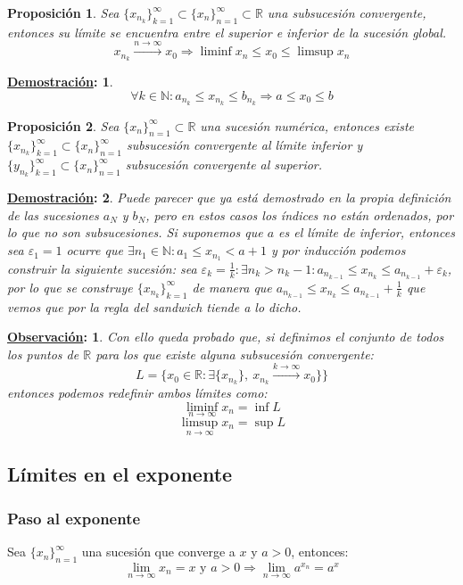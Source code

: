 \documentclass[10pt,a4paper,openright]{book}
\theoremstyle{break}
\newtheorem*{prop}{Proposición}
\newtheorem*{demo}{\underline{Demostración}:}
\newtheorem*{obs}{\underline{Observación}:}
\begin{document}
\begin{prop}
Sea $\{x_{n_k}\}_{k=1}^\infty\subset \{x_n\}_{n=1}^\infty\subset \mathbb{R}$ una subsucesión convergente, entonces su límite se encuentra entre el superior e inferior de la sucesión global.
$$ x_{n_k}\xrightarrow{n\rightarrow\infty}x_0 \Rightarrow \liminf x_n \leq x_0 \leq \limsup x_n$$
\end{prop}
\begin{demo}
$$\forall k\in \mathbb N: a_{n_k}\leq x_{n_k} \leq b_{n_k} \Rightarrow a\leq x_0 \leq b$$
\end{demo}

\begin{prop}
Sea $\{x_n\}_{n=1}^\infty \subset \mathbb{R}$ una sucesión numérica, entonces existe $\{x_{n_k}\}_{k=1}^\infty\subset \{x_n\}_{n=1}^\infty$ subsucesión convergente al límite inferior y $\{y_{n_k}\}_{k=1}^\infty\subset \{x_n\}_{n=1}^\infty$ subsucesión convergente al superior.
\end{prop}
\begin{demo}
Puede parecer que ya está demostrado en la propia definición de las sucesiones $a_N$ y $b_N$, pero en estos casos los índices no están ordenados, por lo que no son subsucesiones.
Si suponemos que $a$ es el límite de inferior, entonces sea $\varepsilon_1=1$ ocurre que $\exists n_1\in \mathbb N: a_1\leq x_{n_1}<a+1$ y por inducción podemos construir la siguiente sucesión: sea $\varepsilon_k= \frac{1}{k} : \exists n_k > n_k -1: a_{n_{k-1}}\leq x_{n_k}\leq a_{n_{k-1}}+\varepsilon_k$, por lo que se construye $\{x_{n_k}\}_{k=1}^\infty$ de manera que $a_{n_{k-1}}\leq x_{n_k}\leq a_{n_{k-1}}+\frac{1}{k}$ que vemos que por la regla del sandwich tiende a lo dicho.
\end{demo}

\begin{obs}
Con ello queda probado que, si definimos el conjunto de todos los puntos de $\mathbb{R}$ para los que existe alguna subsucesión convergente:
$$L=\{x_0\in \mathbb R: \exists \{x_{n_k}\}, \ x_{n_k}\xrightarrow{k\rightarrow \infty} x_0\}\}$$
entonces podemos redefinir ambos límites como:
$$\liminf_{n\rightarrow\infty}x_n=\inf L$$
$$\limsup_{n\rightarrow\infty}x_n=\sup L$$
\end{obs}

\subsection{Límites en el exponente}
\subsubsection{Paso al exponente}
Sea $\{x_n\}_{n=1}^\infty$ una sucesión que converge a $x$ y $a>0$, entonces:
$$\lim_{n\rightarrow \infty} x_n = x \mbox{ y }a>0\Rightarrow \lim_{n\rightarrow\infty} a^{x_n}=a^x$$
\end{document}
